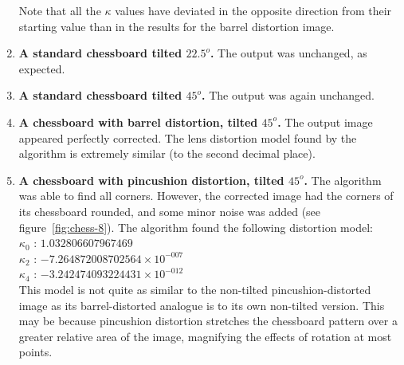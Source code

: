\begin{enumerate}
   Note that all the $\kappa$ values have deviated in the opposite direction from their starting value than in the results for the barrel distortion image.
  \item \textbf{A standard chessboard tilted $22.5^o$.} The output was unchanged, as expected.
  \item \textbf{A standard chessboard tilted $45^o$.} The output was again unchanged.
  \item \textbf{A chessboard with barrel distortion, tilted $45^o$.} The output image appeared perfectly corrected. The lens distortion model found by the algorithm is extremely similar (to the second decimal place).
  \item \textbf{A chessboard with pincushion distortion, tilted $45^o$.} The algorithm was able to find all corners. However, the corrected image had the corners of its chessboard rounded, and some minor noise was added (see figure~\ref{fig:chess-8}). The algorithm found the following distortion model:\\
   $ \kappa_{0}$ : $1.032806607967469$\\
   $ \kappa_{2}$ : $-7.264872008702564 \times 10^{-007}$\\
   $ \kappa_{4}$ : $-3.242474093224431 \times 10^{-012}$\\
   This model is not quite as similar to the non-tilted pincushion-distorted image as its barrel-distorted analogue is to its own non-tilted version. This may be because pincushion distortion stretches the chessboard pattern over a greater relative area of the image, magnifying the effects of rotation at most points.
\begin{figure}[h]
  \centering

\end{figure}
\end{enumerate}
